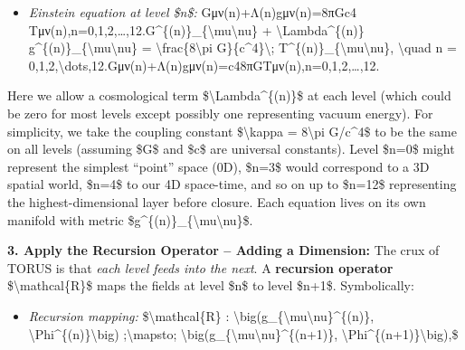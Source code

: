 \documentclass[
]{article}
\begin{document}
\begin{itemize}
\item
  \emph{Einstein equation at level \$n\$:}
  Gμν(n)+Λ(n)gμν(n)=8πGc4  Tμν(n),n=0,1,2,\ldots,12.G\^{}\{(n)\}\_\{\textbackslash mu\textbackslash nu\}
  + \textbackslash Lambda\^{}\{(n)\}
  g\^{}\{(n)\}\_\{\textbackslash mu\textbackslash nu\} =
  \textbackslash frac\{8\textbackslash pi G\}\{c\^{}4\}\textbackslash;
  T\^{}\{(n)\}\_\{\textbackslash mu\textbackslash nu\},
  \textbackslash quad n =
  0,1,2,\textbackslash dots,12.Gμν(n)\hspace{0pt}+Λ(n)gμν(n)\hspace{0pt}=c48πG\hspace{0pt}Tμν(n)\hspace{0pt},n=0,1,2,\ldots,12.
\end{itemize}

Here we allow a cosmological term \$\textbackslash Lambda\^{}\{(n)\}\$
at each level (which could be zero for most levels except possibly one
representing vacuum energy). For simplicity, we take the coupling
constant \$\textbackslash kappa = 8\textbackslash pi G/c\^{}4\$ to be
the same on all levels (assuming \$G\$ and \$c\$ are universal
constants)\hspace{0pt}. Level \$n=0\$ might represent the simplest
``point'' space (0D), \$n=3\$ would correspond to a 3D spatial world,
\$n=4\$ to our 4D space-time, and so on up to \$n=12\$ representing the
highest-dimensional layer before closure. Each equation lives on its own
manifold with metric
\$g\^{}\{(n)\}\_\{\textbackslash mu\textbackslash nu\}\$.

\textbf{3. Apply the Recursion Operator -- Adding a Dimension:} The crux
of TORUS is that \emph{each level feeds into the next}. A
\textbf{recursion operator} \$\textbackslash mathcal\{R\}\$ maps the
fields at level \$n\$ to level \$n+1\$. Symbolically\hspace{0pt}:

\begin{itemize}
\item
  \emph{Recursion mapping:} \$\textbackslash mathcal\{R\} :
  \textbackslash big(g\_\{\textbackslash mu\textbackslash nu\}\^{}\{(n)\},
  \textbackslash Phi\^{}\{(n)\}\textbackslash big)
  ;\textbackslash mapsto;
  \textbackslash big(g\_\{\textbackslash mu\textbackslash nu\}\^{}\{(n+1)\},
  \textbackslash Phi\^{}\{(n+1)\}\textbackslash big),\$
\end{itemize}
\end{document}
